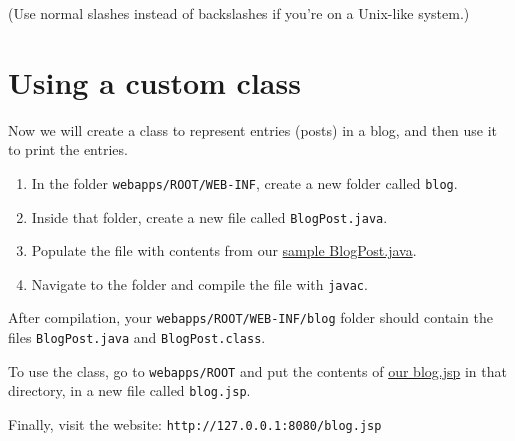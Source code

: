 \documentclass[a4paper, english]{article}
\begin{document}
        (Use normal slashes instead of backslashes if you're on a Unix-like system.)

    \section{Using a custom class}
        Now we will create a class to represent entries (posts) in a blog, and then use it to print the entries.

        \begin{enumerate}
            \item In the folder \texttt{webapps/ROOT/WEB-INF}, create a new folder called \texttt{blog}.
            \item Inside that folder, create a new file called \texttt{BlogPost.java}.
            \item Populate the file with contents from our \href{https://klistra.in/CCB1CNyG}{sample BlogPost.java}.
            \item Navigate to the folder and compile the file with \texttt{javac}.
        \end{enumerate}

        After compilation, your \texttt{webapps/ROOT/WEB-INF/blog} folder should contain the files \texttt{BlogPost.java} and \texttt{BlogPost.class}.

        To use the class, go to \texttt{webapps/ROOT} and put the contents of \href{https://klistra.in/v0X9t8dd}{our blog.jsp} in that directory, in a new file called \texttt{blog.jsp}.

        Finally, visit the website: \texttt{http://127.0.0.1:8080/blog.jsp}
\end{document}
